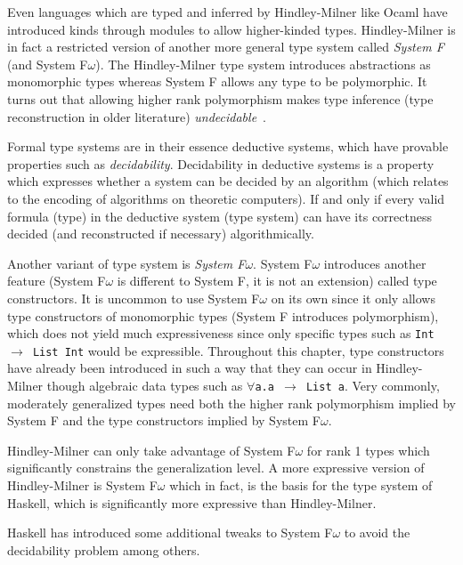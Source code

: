 \documentclass[11pt,oneside,a4paper]{report}
\begin{document}
Even languages which are typed and inferred by Hindley-Milner like Ocaml have introduced kinds through modules to allow higher-kinded types.
Hindley-Milner is in fact a restricted version of another more general type system called \textit{System F} (and System F\underline{$\omega$}).
The Hindley-Milner type system introduces abstractions as monomorphic types whereas System F allows any type to be polymorphic.
It turns out that allowing higher rank polymorphism makes type inference (type reconstruction in older literature) \textit{undecidable}~\cite{wells1999typability}.
\begin{remark}
    Formal type systems are in their essence deductive systems, which have provable properties such as \textit{decidability}.
    Decidability in deductive systems is a property which expresses whether a system can be decided by an algorithm (which relates to the encoding of algorithms on theoretic computers).
    If and only if every valid formula (type) in the deductive system (type system) can have its correctness decided (and reconstructed if necessary) algorithmically.
\end{remark}

Another variant of type system is \textit{System F\underline{$\omega$}}.
System F\underline{$\omega$} introduces another feature (System F\underline{$\omega$} is different to System F, it is not an extension) called type constructors.
It is uncommon to use System F\underline{$\omega$} on its own since it only allows type constructors of monomorphic types (System F introduces polymorphism), which does not yield much expressiveness since only specific types such as \texttt{Int $\rightarrow$ List Int} would be expressible.
Throughout this chapter, type constructors have already been introduced in such a way that they can occur in Hindley-Milner though algebraic data types such as \texttt{$\forall$a.a $\rightarrow$ List a}.
Very commonly, moderately generalized types need both the higher rank polymorphism implied by System F and the type constructors implied by System F\underline{$\omega$}.

Hindley-Milner can only take advantage of System F\underline{$\omega$} for rank 1 types which significantly constrains the generalization level.
A more expressive version of Hindley-Milner is System F$\omega$ which in fact, is the basis for the type system of Haskell, which is significantly more expressive than Hindley-Milner.
\begin{remark}
    Haskell has introduced some additional tweaks to System F$\omega$ to avoid the decidability problem among others.
\end{remark}
\end{document}
